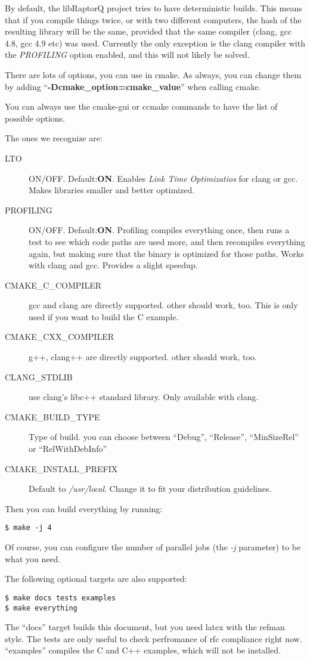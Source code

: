 \documentclass[11pt,a4paper]{refart}
\begin{document}
By default, the libRaptorQ project tries to have deterministic builds. This means that if you compile things twice, or with two different computers, the
hash of the resulting library will be the same, provided that the same compiler (clang, gcc 4.8, gcc 4.9 etc) was used. Currently the only exception is the clang
compiler with the \textit{PROFILING} option enabled, and this will not likely be solved.

There are lots of options, you can use in cmake. As always, you can change them by adding ``\textbf{-Dcmake\_option=cmake\_value}'' when calling cmake.

You can always use the cmake-gui or ccmake commands to have the list of possible options.

The ones we recognize are:

\begin{description}
\item[LTO] ON/OFF. Default:\textbf{ON}. Enables \textit{Link Time Optimizatios} for clang or gcc. Makes libraries smaller and better optimized.
\item[PROFILING] ON/OFF. Default:\textbf{ON}.
Profiling compiles everything once, then runs a test to see which code paths are used more, and then
recompiles everything again, but making sure that the binary is optimized for those paths. Works with clang and gcc. Provides a slight speedup.
\item[CMAKE\_C\_COMPILER] gcc and clang are directly supported. other should work, too. This is only used if you want to build the C example.
\item[CMAKE\_CXX\_COMPILER] g++, clang++ are directly supported. other should work, too.
\item[CLANG\_STDLIB] use clang's libc++ standard library. Only available with clang.
\item[CMAKE\_BUILD\_TYPE] Type of build. you can choose between ``Debug'', ``Release'', ``MinSizeRel'' or ``RelWithDebInfo''
\item[CMAKE\_INSTALL\_PREFIX] Default to \textit{/usr/local}. Change it to fit your distribution guidelines.
\end{description}

Then you can build everything by running:
\begin{verbatim}
$ make -j 4
\end{verbatim}
Of course, you can configure the number of parallel jobs (the \textit{-j} parameter) to be what you need.

The following optional targets are also supported:
\begin{verbatim}
$ make docs tests examples
$ make everything
\end{verbatim}
The ``docs'' target builds this document, but you need latex with the refman style.
The tests are only useful to check perfromance of rfc compliance right now. ``examples'' compiles the C and C++ examples, which will not be installed.
\end{document}
